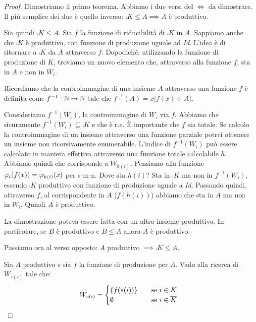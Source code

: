 \begin{proof}
    Dimostriamo il primo teorema. Abbiamo i due versi del $\iff$ da dimostrare. Il più semplice dei due è
    quello inverso: $\comp{K} \leq A \implies A$ è produttivo.

    Sia quindi $\comp{K} \leq A$. Sia $f$ la funzione di riducibilità di $\comp{K}$ in $A$. Sappiamo anche che
    $\comp{K}$ è produttivo, con funzione di produzione uguale ad \textit{Id}. L'idea è di ritornare a
    $\comp{K}$ da $A$ attraverso $f$. Dopodiché, utilizzando la funzione di produzione di $K$,
    troviamo un nuovo elemento che, attraverso alla funzione $f$, sta in $A$ e non in $W_{i}$.

    Ricordiamo che la controimmagine di una insieme $A$ attraverso una funzione $f$ è definita come
    $f^{-1}: \mathbb{N} \to \mathbb{N}$ tale che $f^{-1}(A) = {x | f(x) \in A})$.

    Consideriamo $f^{-1}(W_{i})$, la controimmagine di $W_{i}$ via $f$. Abbiamo che sicuramente
    $f^{-1}(W_{i}) \subseteq \comp{K}$ e che è r.e. È importante che $f$ sia totale. Se calcolo la
    controimmagine di un insieme attraverso una funzione parziale potrei ottenere un insieme non
    ricorsivamente enumerabile. L'indice di $f^{-1}(W_{i})$ può essere calcolato in maniera
    effettiva attraverso una funzione totale calcolabile $h$.  Abbiamo quindi che corrisponde a
    $W_{h(i)}$. Pensiamo alla funzione $\varphi_{i}(f(x)) = \varphi_{h(i)}(x)$ per s-m-n. Dove sta $h(i)$?
    Sta in $\comp{K}$ ma non in $f^{-1}(W_{i})$, essendo $\comp{K}$ produttivo con funzione di
    produzione uguale a \textit{Id}. Passando quindi, attraverso $f$, al corrispondente in $A$
    ($f(h(i))$) abbiamo che sta in $A$ ma non in $W_{i}$. Quindi $A$ è produttivo.

    La dimostrazione poteva essere fatta con un altro insieme produttivo. In particolare, se $B$ è
    produttivo e $B \leq A$ allora $A$ è produttivo.

    Passiamo ora al verso opposto: $A$ produttivo $\implies \comp{K} \leq A$.

    Sia $A$ produttivo e sia $f$ la funzione di produzione per $A$. Vado alla ricerca di $W_{s(i)}$
    tale che:
    \begin{equation*}
        W_{s(i)} =
        \begin{cases}
            \{f(s(i))\} \quad &\text{se $i \in K$} \\
            \emptyset \quad &\text{se $i \in \overline{K}$}
        \end{cases}
    \end{equation*}


\end{proof}
